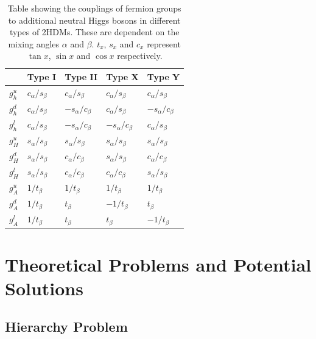 \begin{table}[H]
    \centering
    \begin{tabular}{|x{1.0cm}|x{2.0cm}x{2.0cm}x{2.0cm}x{2.0cm}|}
    		\hline
    	 	& Type I & Type II & Type X & Type Y \\
    	 	\hline
    	 	\hline
    	 	$g_{h}^{u}$ & $c_{\alpha}/s_{\beta}$ & $c_{\alpha}/s_{\beta}$  & $c_{\alpha}/s_{\beta}$  & $c_{\alpha}/s_{\beta}$  \\ 
    	 	$g_{h}^{d}$ & $c_{\alpha}/s_{\beta}$ & $-s_{\alpha}/c_{\beta}$ & $c_{\alpha}/s_{\beta}$  & $-s_{\alpha}/c_{\beta}$ \\
    	 	$g_{h}^{l}$ & $c_{\alpha}/s_{\beta}$ & $-s_{\alpha}/c_{\beta}$ & $-s_{\alpha}/c_{\beta}$ & $c_{\alpha}/s_{\beta}$  \\
    	 	\hline
    	 	$g_{H}^{u}$ & $s_{\alpha}/s_{\beta}$ & $s_{\alpha}/s_{\beta}$ & $s_{\alpha}/s_{\beta}$ & $s_{\alpha}/s_{\beta}$ \\
    	 	$g_{H}^{d}$ & $s_{\alpha}/s_{\beta}$ & $c_{\alpha}/c_{\beta}$ & $s_{\alpha}/s_{\beta}$ & $c_{\alpha}/c_{\beta}$ \\
    	 	$g_{H}^{l}$ & $s_{\alpha}/s_{\beta}$ & $c_{\alpha}/c_{\beta}$ & $c_{\alpha}/c_{\beta}$ & $s_{\alpha}/s_{\beta}$ \\
    	 	\hline
    	 	$g_{A}^{u}$ & $1/t_{\beta}$ & $1/t_{\beta}$ & $1/t_{\beta}$  & $1/t_{\beta}$ \\
    	 	$g_{A}^{d}$ & $1/t_{\beta}$ & $t_{\beta}$   & $-1/t_{\beta}$ & $t_{\beta}$ \\
    	 	$g_{A}^{l}$ & $1/t_{\beta}$ & $t_{\beta}$   & $t_{\beta}$    & $-1/t_{\beta}$ \\
        \hline
    \end{tabular}
    \caption{Table showing the couplings of fermion groups to additional neutral Higgs bosons in different types of 2HDMs. These are dependent on the mixing angles $\alpha$ and $\beta$. $t_{x}$, $s_{x}$ and $c_{x}$ represent $\tan x$, $\sin x$ and $\cos x$ respectively.}
\end{table}

\section{Theoretical Problems and Potential Solutions}

\subsection{Hierarchy Problem}

